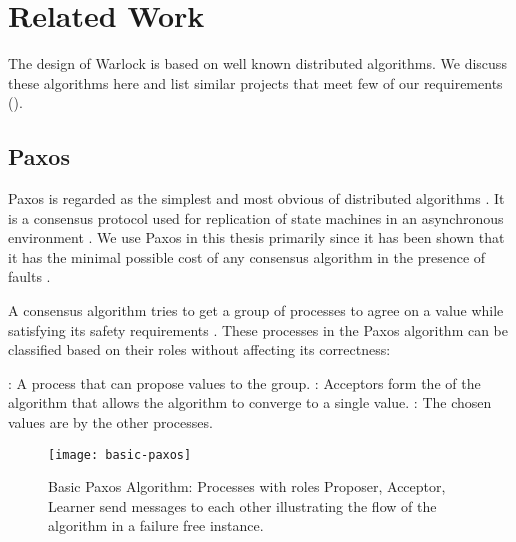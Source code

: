 \chapter{Related Work}
\label{chapter:related.work}

The design of Warlock is based on well known distributed algorithms. We discuss
these algorithms here and list similar projects that meet few of our
requirements ().

\section{Paxos}
\label{section:paxos}

Paxos is regarded as the simplest and most obvious of distributed algorithms
\citep{Lamport01}. It is a consensus protocol used for replication of state
machines in an asynchronous environment \citep{Lamport98}. We use Paxos in this
thesis primarily since it has been shown that it has the minimal possible cost
of any consensus algorithm in the presence of faults \citep{KeidarR03}.

A consensus algorithm tries to get a group of processes to agree on a value
while satisfying its safety requirements%
.
These processes in the Paxos algorithm can be classified based on their roles
without affecting its correctness:

\begin{itemize}
  : A process that can propose values to the group.
  : Acceptors form the  of the algorithm that allows
  the algorithm to converge to a single value.
  : The chosen values are  by the other processes.
\end{itemize}

\begin{figure}
  \texttt{[image: basic-paxos]}
      \caption[Basic Paxos]{%
        Basic Paxos Algorithm: Processes with roles \dash{} Proposer, Acceptor,
        Learner \dash{} send messages to each other illustrating the flow of the
        algorithm in a failure free instance.}
      \label{figure:basic_paxos}
  \normalcaption
\end{figure}

